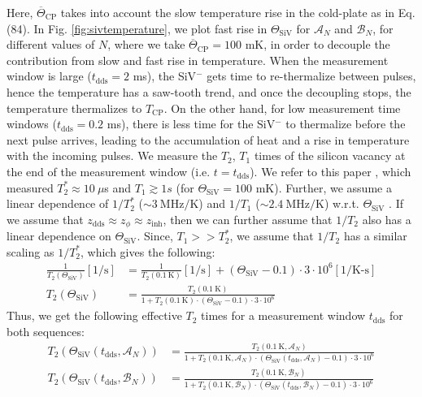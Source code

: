  Here, $\overline{\Theta}_{\text{CP}}$ takes into account the slow temperature rise in the cold-plate as in Eq.(84). In Fig. \ref{fig:sivtemperature}, we plot fast rise in $\Theta_{\text{SiV}}$ for $\mathcal{A}_{N}$ and $\mathcal{B}_{N}$, for different values of $N$, where we take $\overline{\Theta}_{\text{CP}}=100$ mK, in order to decouple the contribution from slow and fast rise in temperature. When the measurement window is large ($t_{\text{dds}}=2 $ ms), the SiV$^-$ gets time to re-thermalize between pulses, hence the temperature has a saw-tooth trend, and once the decoupling stops, the temperature thermalizes to $T_{\text{CP}}$. On the other hand, for low measurement time windows ($t_{\text{dds}}=0.2$ ms), there is less time for the SiV$^-$ to thermalize before the next pulse arrives, leading to the accumulation of heat and a rise in temperature with the incoming pulses. We measure the $T_{2}$, $T_{1}$ times of the silicon vacancy at the end of the measurement window (i.e. $t=t_{\text{dds}}$). We refer to this paper \cite{Sukachev_2017}, which measured $T^{*}_{2}\approx10~\mu$s  and $T_{1}\gtrsim1s$ (for $\Theta_{\text{SiV}} = 100$ mK). Further, we assume a linear dependence of $1/T^{*}_{2}$ ($\sim3~\text{MHz/K}$) and $1/T_{1}$ ($\sim2.4~\text{MHz/K}$) w.r.t. $\Theta_{\text{SiV}}$ \cite{Jahnke_2015}. If we assume that $z_{\text{dds}}\approx z_{\phi}\approx z_{\text{inh}}$, then we can further assume that $1/T_{2}$ also has a linear dependence on $\Theta_{\text{SiV}}$. Since, $T_{1}>>T^{*}_{2}$, we assume that $1/T_{2}$ has a similar scaling as $1/T^{*}_{2}$, which gives the following:
\begin{subequations}
    \begin{align}
       \frac{1}{T_{2}(\Theta_{\text{SiV}})} \left[1/\text{s}\right] &= \frac{1}{T_{2}(0.1~\text{K})} \left[1/\text{s}\right] + (\Theta_{\text{SiV}}-0.1)\cdot 3\cdot10^{6} \left[1/\text{K-s}\right]\\
       T_{2}(\Theta_{\text{SiV}}) &= \frac{T_{2}(0.1~\text{K})}{1 + T_{2}(0.1~\text{K})\cdot(\Theta_{\text{SiV}}-0.1)\cdot3\cdot10^{6}}
    \end{align}
\end{subequations}
Thus, we get the following effective $T_{2}$ times for a measurement window $t_{\text{dds}}$ for both sequences:
\begin{subequations}
    \begin{align}
       T_{2}(\Theta_{\text{SiV}}(t_{\text{dds}},\mathcal{A}_{N})) &= \frac{T_{2}(0.1~\text{K},\mathcal{A}_{N})}{1 + T_{2}(0.1~\text{K},\mathcal{A}_{N})\cdot(\Theta_{\text{SiV}}(t_{\text{dds}},\mathcal{A}_{N})-0.1)\cdot3\cdot10^{6}}\\[1.5ex]
       T_{2}(\Theta_{\text{SiV}}(t_{\text{dds}},\mathcal{B}_{N})) &= \frac{T_{2}(0.1~\text{K},\mathcal{B}_{N})}{1 + T_{2}(0.1~\text{K},\mathcal{B}_{N})\cdot(\Theta_{\text{SiV}}(t_{\text{dds}},\mathcal{B}_{N})-0.1)\cdot3\cdot10^{6}}
    \end{align}
\end{subequations}
